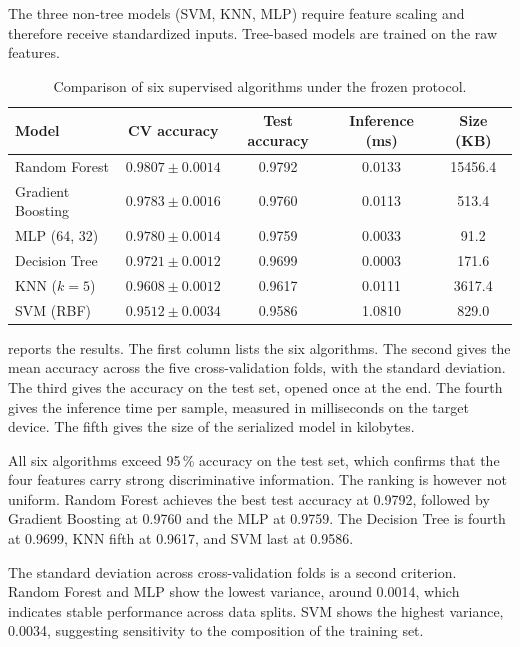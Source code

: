 The three non-tree models (SVM, KNN, MLP) require feature scaling and therefore receive standardized inputs. Tree-based models are trained on the raw features.

\begin{table}[htbp]
	\centering
	\caption{Comparison of six supervised algorithms under the frozen protocol.}
	\label{tab:model_comparison}
	\small
	\begin{tabular}{lcccc}
		\toprule
		Model & CV accuracy & Test accuracy & Inference (ms) & Size (KB) \\
		\midrule
		Random Forest     & \(0.9807 \pm 0.0014\) & 0.9792 & 0.0133 & 15456.4 \\
		Gradient Boosting & \(0.9783 \pm 0.0016\) & 0.9760 & 0.0113 & 513.4   \\
		MLP (64, 32)      & \(0.9780 \pm 0.0014\) & 0.9759 & 0.0033 & 91.2    \\
		Decision Tree     & \(0.9721 \pm 0.0012\) & 0.9699 & 0.0003 & 171.6   \\
		KNN (\(k = 5\))   & \(0.9608 \pm 0.0012\) & 0.9617 & 0.0111 & 3617.4  \\
		SVM (RBF)         & \(0.9512 \pm 0.0034\) & 0.9586 & 1.0810 & 829.0   \\
		\bottomrule
	\end{tabular}
\end{table}

 reports the results. The first column lists the six algorithms. The second gives the mean accuracy across the five cross-validation folds, with the standard deviation. The third gives the accuracy on the test set, opened once at the end. The fourth gives the inference time per sample, measured in milliseconds on the target device. The fifth gives the size of the serialized model in kilobytes.

All six algorithms exceed 95\,\% accuracy on the test set, which confirms that the four features carry strong discriminative information. The ranking is however not uniform. Random Forest achieves the best test accuracy at 0.9792, followed by Gradient Boosting at 0.9760 and the MLP at 0.9759. The Decision Tree is fourth at 0.9699, KNN fifth at 0.9617, and SVM last at 0.9586.

The standard deviation across cross-validation folds is a second criterion. Random Forest and MLP show the lowest variance, around 0.0014, which indicates stable performance across data splits. SVM shows the highest variance, 0.0034, suggesting sensitivity to the composition of the training set.

